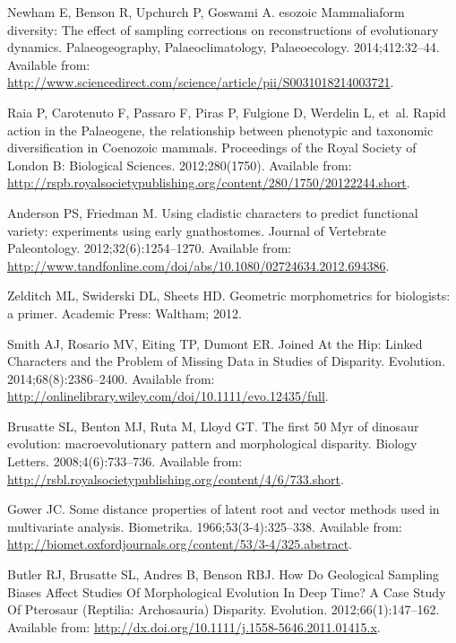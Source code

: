 \documentclass[12pt,letterpaper]{article}
\begin{document}
\begin{thebibliography}{10}
Newham E, Benson R, Upchurch P, Goswami A.
esozoic {M}ammaliaform diversity: The effect of sampling
  corrections on reconstructions of evolutionary dynamics.
\newblock Palaeogeography, Palaeoclimatology, Palaeoecology. 2014;412:32--44.
\newblock Available from:
  \url{http://www.sciencedirect.com/science/article/pii/S0031018214003721}.

Raia P, Carotenuto F, Passaro F, Piras P, Fulgione D, Werdelin L, et~al.
\newblock Rapid action in the {P}alaeogene, the relationship between phenotypic
  and taxonomic diversification in {C}oenozoic mammals.
\newblock Proceedings of the Royal Society of London B: Biological Sciences.
  2012;280(1750).
\newblock Available from:
  \url{http://rspb.royalsocietypublishing.org/content/280/1750/20122244.short}.

Anderson PS, Friedman M.
\newblock Using cladistic characters to predict functional variety: experiments
  using early gnathostomes.
\newblock Journal of Vertebrate Paleontology. 2012;32(6):1254--1270.
\newblock Available from:
  \url{http://www.tandfonline.com/doi/abs/10.1080/02724634.2012.694386}.

Zelditch ML, Swiderski DL, Sheets HD.
\newblock Geometric morphometrics for biologists: a primer.
\newblock Academic Press: Waltham; 2012.

Smith AJ, Rosario MV, Eiting TP, Dumont ER.
\newblock Joined At the Hip: Linked Characters and the Problem of Missing Data
  in Studies of Disparity.
\newblock Evolution. 2014;68(8):2386--2400.
\newblock Available from:
  \url{http://onlinelibrary.wiley.com/doi/10.1111/evo.12435/full}.

Brusatte SL, Benton MJ, Ruta M, Lloyd GT.
\newblock The first 50 {M}yr of dinosaur evolution: macroevolutionary pattern
  and morphological disparity.
\newblock Biology Letters. 2008;4(6):733--736.
\newblock Available from:
  \url{http://rsbl.royalsocietypublishing.org/content/4/6/733.short}.

Gower JC.
\newblock Some distance properties of latent root and vector methods used in
  multivariate analysis.
\newblock Biometrika. 1966;53(3-4):325--338.
\newblock Available from:
  \url{http://biomet.oxfordjournals.org/content/53/3-4/325.abstract}.

Butler RJ, Brusatte SL, Andres B, Benson RBJ.
\newblock How Do Geological Sampling Biases Affect Studies Of Morphological
  Evolution In Deep Time? A Case Study Of Pterosaur ({R}eptilia: {A}rchosauria)
  Disparity.
\newblock Evolution. 2012;66(1):147--162.
\newblock Available from:
  \url{http://dx.doi.org/10.1111/j.1558-5646.2011.01415.x}.


\end{thebibliography}
\end{document}
